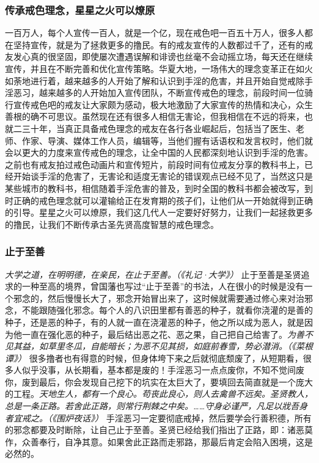 \subsubsection{传承戒色理念，星星之火可以燎原}

一百万人，每个人宣传一百人，就是一个亿，现在戒色吧一百五十万人，很多人都在坚持宣传，就是为了拯救更多的撸民。有的戒友宣传的人数都过千了，还有的戒友发心真的很坚固，即使屡次遭遇误解和诽谤也丝毫不会动摇立场，每天还在继续宣传，并且在不断完善和优化宣传策略。华夏大地，一场伟大的理念变革正在如火如荼地进行着，越来越多的人开始了解和认识到手淫的危害，并且开始自觉戒除手淫恶习，越来越多的人开始加入宣传团队，不断宣传戒色的理念，前段时间一位骑行宣传戒色吧的戒友让大家颇为感动，极大地激励了大家宣传的热情和决心，众生善根的确不可思议。虽然现在还有很多人相信无害论，但我相信在不远的将来，也就二三十年，当真正具备戒色理念的戒友在各行各业崛起后，包括当了医生、老师、作家、导演、媒体工作人员，编辑等，当他们握有话语权和发言权时，他们就会以更大的力度来宣传戒色的理念，让全中国的人民都深刻地认识到手淫的危害。之前也有戒友拍过戒色动画片和宣传短片，前段时间有位戒友分享的教科书上，已经开始谈手淫的危害了，无害论和适度无害论的错误观点已经不见了，当然这只是某些城市的教科书，相信随着手淫危害的普及，到时全国的教科书都会被改写，到时正确的戒色理念就可以灌输给正在发育期的孩子们，让他们从一开始就得到正确的引导。星星之火可以燎原，我们这几代人一定要好好努力，让我们一起拯救更多的撸民，让我们不断传承古圣先贤高度智慧的戒色理念。

\subsubsection{止于至善}

\textit{大学之道，在明明德，在亲民，在止于至善。（《礼记·大学》）} 止于至善是圣贤追求的一种至高的境界，曾国藩也写过“止于至善”的书法，人在很小的时候是没有一个邪念的，然后慢慢长大了，邪念开始冒出来了，这时候就需要通过修心来对治邪念，不能跟随强化邪念。每个人的八识田里都有善恶的种子，就看你浇灌的是善的种子，还是恶的种子，有的人就一直在浇灌恶的种子，他之所以成为恶人，就是因为他一直在强化恶的种子，最后结出恶之花、恶之果，自己把自己给害了。\textit{为善不见其益，如草里冬瓜，自能暗长；为恶不见其损，如庭前春雪，势必潜消。（《菜根谭》）} 很多撸者也有得意的时候，但身体垮下来之后就彻底颓废了，从短期看，很多人似乎没事，从长期看，基本都是废的！手淫恶习一点点废你，不知不觉间废你，废到最后，你会发现自己挖下的坑实在太巨大了，要填回去简直就是一个庞大的工程。\textit{天地生人，都有一个良心。苟丧此良心，则人去禽兽不远矣。圣贤教人，总是一条正路。若舍此正路，则常行荆棘之中矣。……守身必谨严，凡足以戕吾身者宜戒之。（《围炉夜话》）} 手淫恶习一定要彻底戒掉，然后要学会行善积德，所有的邪念都要及时断除，让自己止于至善。圣贤已经给我们指出了正路，即：诸恶莫作，众善奉行，自净其意。如果舍此正路而走邪路，那最后肯定会陷入困境，这是必然的。


